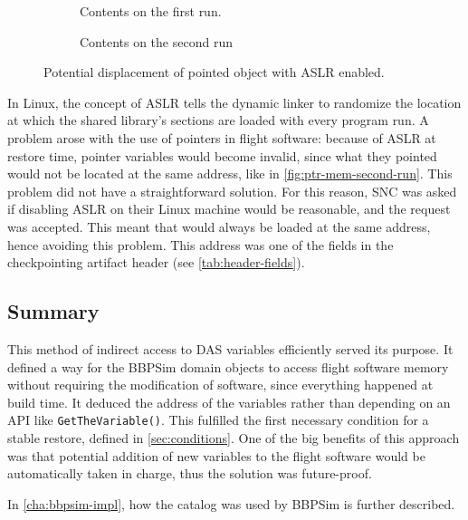 {\begin{figure}[htbp]
	\centering
	\begin{subfigure}[t]{.58\linewidth}
		\small
		\centering
		
		\caption{Contents on the first run.}
		\label{fig:ptr-mem-first-run}
	\end{subfigure}%
	\begin{subfigure}[t]{.38\linewidth}
		\small
		\centering
		
		\caption{Contents on the second run}
		\label{fig:ptr-mem-second-run}
	\end{subfigure}
	\caption{Potential displacement of pointed object with ASLR enabled.}
	\label{fig:mem-displacement}
\end{figure}

In Linux, the concept of \gls{ASLR} tells the dynamic linker to randomize the location at which the shared library's sections are loaded with every program run. A problem arose with the use of pointers in flight software: because of ASLR at restore time, pointer variables would become invalid, since what they pointed would not be located at the same address, like in  \autoref{fig:ptr-mem-second-run}. This problem did not have a straightforward solution. For this reason, \gls{SNC} was asked if disabling \gls{ASLR} on their Linux machine would be reasonable, and the request was accepted. This meant that  would always be loaded at the same address, hence avoiding this problem. This address was one of the fields in the checkpointing artifact header (see \autoref{tab:header-fields}).

\subsection*{Summary}
This method of indirect access to DAS variables efficiently served its purpose. It defined a way for the BBPSim domain objects to access flight software memory without requiring the modification of software, since everything happened at build time. It deduced the address of the variables rather than depending on an API like \texttt{GetTheVariable()}. This fulfilled the first necessary condition for a stable restore, defined in \autoref{sec:conditions}. One of the big benefits of this approach was that potential addition of new variables to the flight software would be automatically taken in charge, thus the solution was future-proof.

In \autoref{cha:bbpsim-impl}, how the catalog was used by \gls{BBPSim} is further described.
}